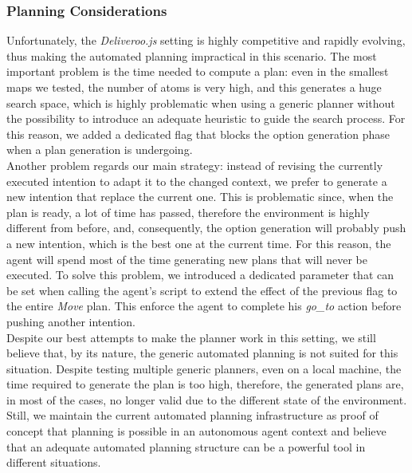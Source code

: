         \subsubsection{Planning Considerations}
            Unfortunately, the \textit{Deliveroo.js} setting is highly competitive and rapidly evolving, thus making the automated planning impractical in this scenario. The most important problem is the time needed to compute a plan: even in the smallest maps we tested, the number of atoms is very high, and this generates a huge search space, which is highly problematic when using a generic planner without the possibility to introduce an adequate heuristic to guide the search process. For this reason, we added a dedicated flag that blocks the option generation phase when a plan generation is undergoing.
            \medskip\\
            Another problem regards our main strategy: instead of revising the currently executed intention to adapt it to the changed context, we prefer to generate a new intention that replace the current one. This is problematic since, when the plan is ready, a lot of time has passed, therefore the environment is highly different from before, and, consequently, the option generation will probably push a new intention, which is the best one at the current time. For this reason, the agent will spend most of the time generating new plans that will never be executed. To solve this problem, we introduced a dedicated parameter that can be set when calling the agent's script to extend the effect of the previous flag to the entire \textit{Move} plan. This enforce the agent to complete his \textit{go\_to} action before pushing another intention.
            \medskip\\
            Despite our best attempts to make the planner work in this setting, we still believe that, by its nature, the generic automated planning is not suited for this situation. Despite testing multiple generic planners, even on a local machine, the time required to generate the plan is too high, therefore, the generated plans are, in most of the cases, no longer valid due to the different state of the environment. Still, we maintain the current automated planning infrastructure as proof of concept that planning is possible in an autonomous agent context and believe that an adequate automated planning structure can be a powerful tool in different situations.


